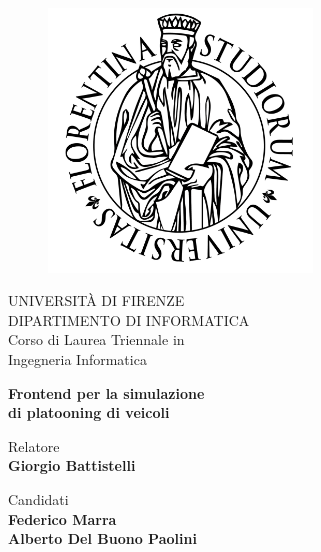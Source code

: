 \begin{titlepage}
\begin{figure}[H]
    \centering
    \includegraphics[width=7cm]{images/unifi.png}
\end{figure}

\begin{center}
    \LARGE{UNIVERSITÀ DI FIRENZE}
    \vspace{1mm}
    \\ \large{DIPARTIMENTO DI INFORMATICA }
    \vspace{5mm}
    \\ \LARGE{Corso di Laurea Triennale in \\[-1mm] Ingegneria Informatica}
\end{center}

\vspace{15mm}
\begin{center}\LARGE\textbf{Frontend per la simulazione \\[-0.1em] di platooning di veicoli}
\end{center}
\vspace{30mm}

\begin{minipage}[t]{0.47\textwidth}
	{\large{Relatore}{\normalsize\vspace{3mm}
	\bf\\ \large{Giorgio Battistelli}}}
\end{minipage}
\hfill
\begin{minipage}[t]{0.47\textwidth}\raggedleft
	{\large{Candidati}{\normalsize\vspace{3mm}
	\bf\\ \large{Federico Marra \vspace{2mm}\\Alberto Del Buono Paolini}}}
\end{minipage}

\end{titlepage}